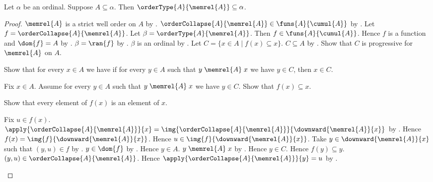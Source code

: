 \begin{theorem}\label{ordinal_subset_order_type_bound}
    Let $\alpha$ be an ordinal.
    Suppose $A\subseteq\alpha$.
    Then $\orderType{A}{\memrel{A}}\subseteq\alpha$.
\end{theorem}
\begin{proof}
    $\memrel{A}$ is a strict well order on $A$ by
        .
    $\orderCollapse{A}{\memrel{A}}\in\funs{A}{\cumul{A}}$ by
        .
    Let $f=\orderCollapse{A}{\memrel{A}}$.
    Let $\beta=\orderType{A}{\memrel{A}}$.
    Then $f\in\funs{A}{\cumul{A}}$.
    Hence $f$ is a function and $\dom{f}=A$ by
        .
    $\beta=\ran{f}$ by .
    $\beta$ is an ordinal by .
    Let $C=\{x\in A\mid f(x)\subseteq x\}$.
    $C\subseteq A$ by .
    Show that $C$ is progressive for $\memrel{A}$ on $A$.
    \begin{subproof}
        Show that for every $x\in A$ we have if for every $y\in A$
            such that $y\mathrel{\memrel{A}}x$ we have $y\in C$,
            then $x\in C$.
        \begin{subproof}
            Fix $x\in A$.
            Assume for every $y\in A$ such that
                $y\mathrel{\memrel{A}}x$ we have $y\in C$.
            Show that $f(x)\subseteq x$.
            \begin{subproof}
                Show that every element of $f(x)$ is an element of $x$.
                \begin{subproof}
                    Fix $u\in f(x)$.
                    $\apply{\orderCollapse{A}{\memrel{A}}}{x}
                        =\img{\orderCollapse{A}{\memrel{A}}}
                            {\downward{\memrel{A}}{x}}$ by
                        .
                    Hence $f(x)=\img{f}{\downward{\memrel{A}}{x}}$.
                    Hence $u\in\img{f}{\downward{\memrel{A}}{x}}$.
                    Take $y\in\downward{\memrel{A}}{x}$ such that
                        $(y,u)\in f$ by .
                    $y\in\dom{f}$ by .
                    Hence $y\in A$.
                    $y\mathrel{\memrel{A}}x$ by
                        .
                    Hence $y\in C$.
                    Hence $f(y)\subseteq y$.
                    $(y,u)\in\orderCollapse{A}{\memrel{A}}$.
                    Hence
                        $\apply{\orderCollapse{A}{\memrel{A}}}{y}=u$ by
                        .

\end{subproof}
\end{subproof}
\end{subproof}
\end{subproof}
\end{proof}
